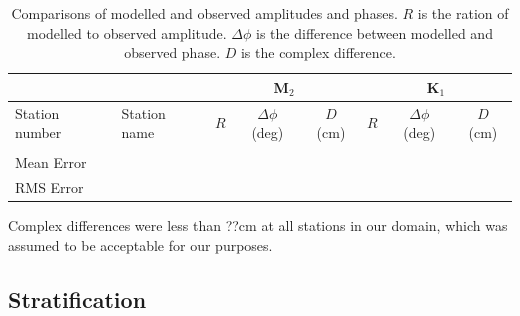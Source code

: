 \documentclass[pdftex,10pt]{article}
\begin{document}
\begin{table}[h]
\centering 
\begin{tabular}{l l c c c c c c} 
\hline 
& & \multicolumn{3}{c}{M$_2$} & \multicolumn{3}{c}{K$_1$} \\ 
\hline 
Station number & Station name & $R$ & $ \Delta \phi$ (deg) & $D$ (cm) & $R$ & $ \Delta \phi$ (deg) & $D$ (cm) \\
\hline 
               &              &     &                      &          &     &                      &          \\
\hline   
Mean Error     &              &     &                      &          &     &                      &          \\
RMS Error      &              &     &                      &          &     &                      &          \\
\hline  
\end{tabular}
\caption{Comparisons of modelled and observed amplitudes and phases. $R$ is the ration of modelled to observed amplitude. $\Delta \phi$ is the difference between modelled and observed phase. $D$ is the complex difference. }
\label{tab:comparison} 
\end{table}


Complex differences were less than ??cm at all stations in our domain, which was assumed to be acceptable for our purposes. 

\subsection{Stratification} 
\end{document}
